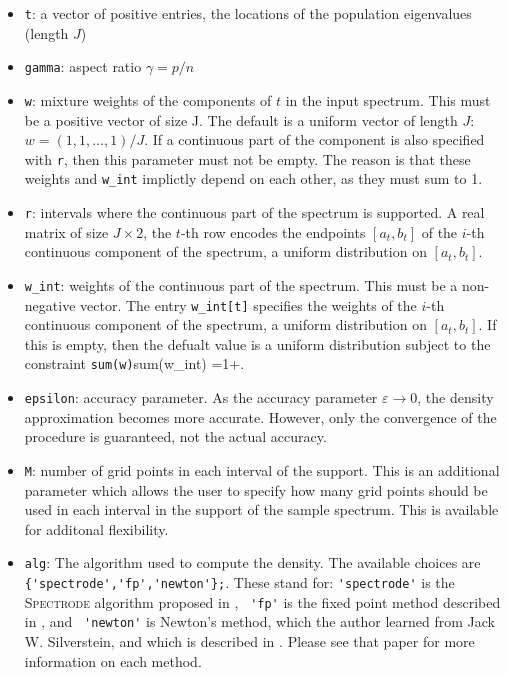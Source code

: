 \documentclass[english,11pt]{article} %
\begin{document}
\begin{itemize}
\item \verb+t+:  a vector of positive entries, the locations of the population eigenvalues (length $J$)
\item \verb+gamma+:  aspect ratio $\gamma = p/n$
\item \verb+w+: mixture weights of the components of $t$ in the input spectrum. This must be a positive vector of size J. The default is a uniform vector of length $J$: $w = (1,1,\ldots,1)/J$. If a continuous part of the component is also specified with \verb+r+, then this parameter must not be empty. The reason is that these weights and \verb+w_int+ implictly depend on each other, as they must sum to 1.

\item \verb+r+: intervals where the continuous part of the spectrum is supported.
       A real matrix of size $J \times 2$, the $t$-th row encodes the endpoints $[a_t,b_t]$ of the $i$-th continuous component of the spectrum, a uniform distribution on $[a_t,b_t]$.
\item \verb+w_int+:   weights of the continuous part of the spectrum. This must be a non-negative vector. The entry \verb+w_int[t]+ specifies the weights of the $i$-th continuous component of the spectrum, a uniform distribution on $[a_t,b_t]$. If this is empty, then the defualt value is a uniform distribution subject to the constraint \verb+sum(w)+sum(w\_int) =1+.
\item \verb+epsilon+: accuracy parameter. As the accuracy parameter $\varepsilon \to 0$, the density approximation becomes more accurate. However, only the convergence of the procedure is guaranteed, not the actual accuracy. 
\item \verb+M+:  number of grid points in each interval of the support. This is an additional parameter which allows the user to specify how many grid points should be used in each interval in the support of the sample spectrum. This is available for additonal flexibility. 
\item \verb+alg+: The algorithm used to compute the density. The available choices are \verb+ {'spectrode','fp','newton'};+. These stand for: \verb+'spectrode'+ is the \textsc{Spectrode} algorithm proposed in \cite{dobriban2015efficient}, \verb+ 'fp'+ is the fixed point method described in \cite{couillet2011deterministic}, and \verb+ 'newton'+ is Newton's method, which the author learned from Jack W. Silverstein, and which is described in \cite{dobriban2015efficient}. Please see that paper for more information on each method. 
\end{itemize}
\end{document}
